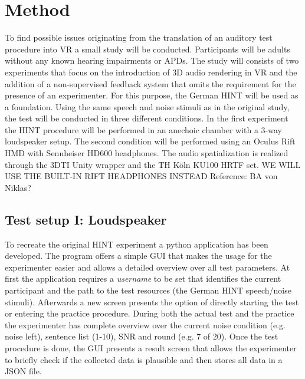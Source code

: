 \documentclass[a4paper,11pt]{article}%
\renewcommand{\\}{\vspace*{0.5\baselineskip} \newline}
\begin{document}
\section{Method}
To find possible issues originating from the translation of an auditory test procedure into \ac{VR} a small study will be conducted. Participants will be adults without any known hearing impairments or \ac{APD}s. The study will consists of two experiments that focus on the introduction of 3D audio rendering in \ac{VR} and the addition of a non-supervised feedback system that omits the requirement for the presence of an experimenter.
\newline
\newline
For this purpose, the German \ac{HINT} will be used as a foundation. Using the same speech and noise stimuli as in the original study, the test will be conducted in three different conditions. In the first experiment the \ac{HINT} procedure will be performed in an anechoic chamber with a 3-way loudspeaker setup. The second condition will be performed using an Oculus Rift \ac{HMD} with Sennheiser HD600 headphones. The audio spatialization is realized through the \ac{3DTI} Unity wrapper and the TH Köln KU100 \ac{HRTF} set.
\newline
\newline
WE WILL USE THE BUILT-IN RIFT HEADPHONES INSTEAD
\newline
\newline
Reference: BA von Niklas?


\subsection{Test setup I: Loudspeaker}
To recreate the original \ac{HINT} experiment a python application has been developed. The program offers a simple \ac{GUI} that makes the usage for the experimenter easier and allows a detailed overview over all test parameters. At first the application requires a \textit{username} to be set that identifies the current participant and the path to the test resources (the German \ac{HINT} speech/noise stimuli). Afterwards a new screen presents the option of directly starting the test or entering the practice procedure. During both the actual test and the practice the experimenter has complete overview over the current noise condition (e.g. \dq noise left\dq{}), sentence list (1-10), \ac{SNR} and round (e.g. 7 of 20).
\newline
\newline
Once the test procedure is done, the \ac{GUI} presents a result screen that allows the experimenter to briefly check if the collected data is plausible and then stores all data in a \ac{JSON} file.
\end{document}
